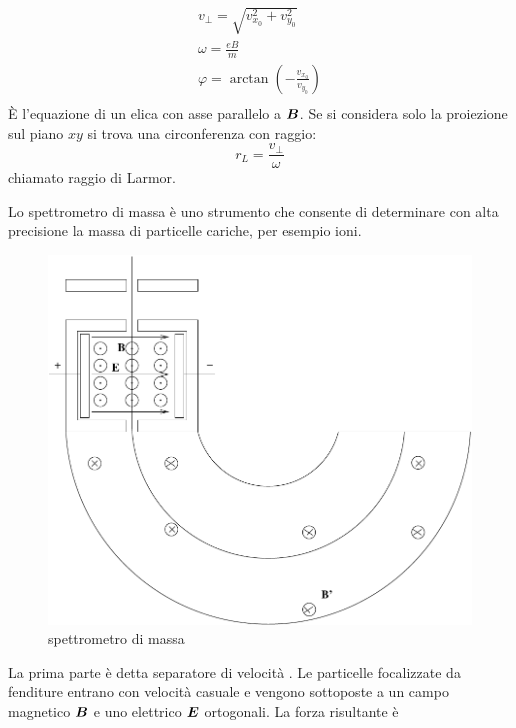 \begin{Es}
\begin{equation*}
\begin{array}{l}
v_\perp=\sqrt{v_{x_0}^2+v_{y_0}^2}\\
\omega=\frac{eB}{m}\\
\varphi=\arctan{\left(-\frac{v_{x_0}}{v_{y_0}}\right)}\\
\end{array}\end{equation*}
\`E l'equazione di un elica con asse parallelo a $\boldsymbol{B}$. Se si considera solo la proiezione sul piano $xy$ si trova una circonferenza con raggio:
\begin{equation*}r_L=\frac{v_\perp}{\omega}\end{equation*}
chiamato raggio di Larmor.
\end{Es}
\begin{Es}\label{spettrometro01}
Lo spettrometro di massa è uno strumento che consente di determinare con alta precisione la massa di particelle cariche, per esempio ioni.
\begin{figure}[htbp]
\centering
\includegraphics[scale=0.5]{immagini/fisica2/spettrometro}
\caption{spettrometro di massa}
\end{figure}
La prima parte è detta separatore di velocità . Le particelle focalizzate da fenditure entrano con velocità casuale e vengono sottoposte a un campo magnetico $\boldsymbol{B}$ e uno elettrico $\boldsymbol{E}$ ortogonali. La forza risultante è 

\end{Es}
